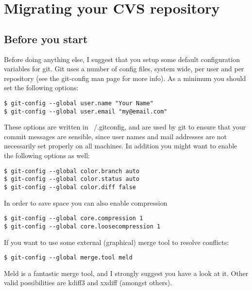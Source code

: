 \documentclass[a4paper,10pt]{article}
\begin{document}
\section{Migrating your CVS repository}
\subsection{Before you start}
Before doing anything else, I suggest that you setup some default
configuration variables for git. Git uses a number of config files, system
wide, per user and per repository (see the git-config man page for more info).
As a minimum you should set the following options:
\begin{verbatim}
$ git-config --global user.name "Your Name"
$ git-config --global user.email "my@email.com"
\end{verbatim}
These options are written in ~/.gitconfig, and are used by git to ensure that
your commit messages are sensible, since user names and mail addresses are not
necessarily set properly on all machines. In addition you might want to enable
the following options as well:
\begin{verbatim}
$ git-config --global color.branch auto
$ git-config --global color.status auto
$ git-config --global color.diff false
\end{verbatim}
In order to save space you can also enable compression
\begin{verbatim}
$ git-config --global core.compression 1
$ git-config --global core.loosecompression 1
\end{verbatim}
If you want to use some external (graphical) merge tool to resolve conflicts:
\begin{verbatim}
$ git-config --global merge.tool meld
\end{verbatim}
Meld is a fantastic merge tool, and I strongly suggest you have a look at it.
Other valid possibilities are kdiff3 and xxdiff (amongst others).
\end{document}
